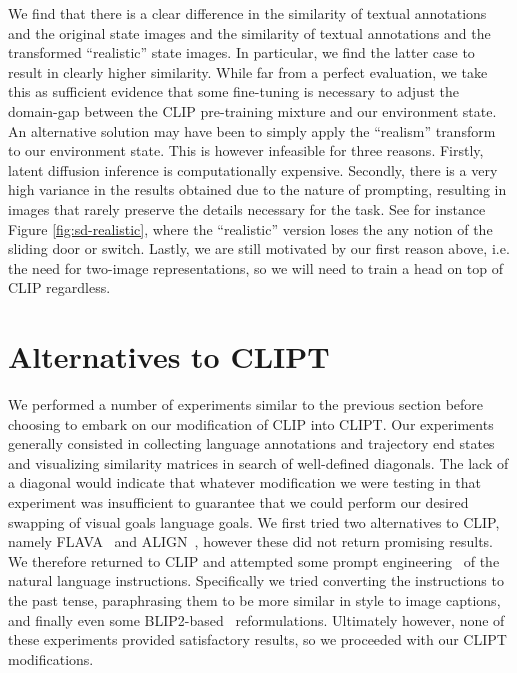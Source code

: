 \documentclass[../main.tex]{subfiles}
\begin{document}
We find that there is a clear difference in the similarity of textual annotations and the original
state images and the similarity of textual annotations and the transformed ``realistic'' state
images. In particular, we find the latter case to result in clearly higher similarity. While far
from a perfect evaluation, we take this as sufficient evidence that some fine-tuning is necessary to
adjust the domain-gap between the CLIP pre-training mixture and our environment state. An
alternative solution may have been to simply apply the ``realism'' transform to our environment
state. This is however infeasible for three reasons. Firstly, latent diffusion inference is
computationally expensive. Secondly, there is a very high variance in the results obtained due to
the nature of prompting, resulting in images that rarely preserve the details necessary for the
task. See for instance Figure \ref{fig:sd-realistic}, where the ``realistic'' version loses the any
notion of the sliding door or switch. Lastly, we are still motivated by our first reason above, i.e.
the need for two-image representations, so we will need to train a head on top of CLIP regardless.


\section{Alternatives to CLIPT}

We performed a number of experiments similar to the previous section before choosing to embark on
our modification of CLIP into CLIPT. Our experiments generally consisted in collecting language
annotations and trajectory end states and visualizing similarity matrices in search of well-defined
diagonals. The lack of a diagonal would indicate that whatever modification we were testing in that
experiment was insufficient to guarantee that we could perform our desired swapping of visual goals
language goals. We first tried two alternatives to CLIP, namely FLAVA~\citep{singh_flava_2022} and
ALIGN~\citep{jia_scaling_2021}, however these did not return promising results. We therefore
returned to CLIP and attempted some prompt engineering~\citep{liu_pre-train_2023,
	gu_systematic_2023} of the natural language instructions. Specifically we tried converting the
instructions to the past tense, paraphrasing them to be more similar in style to image captions, and
finally even some BLIP2-based~\citep{li_blip-2_2023} reformulations. Ultimately however, none of
these experiments provided satisfactory results, so we proceeded with our CLIPT modifications.
\end{document}
